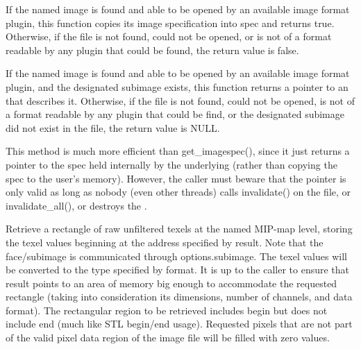 
If the named image is found and able to be opened by an available
image format plugin, this function copies its image specification into
{\cf spec} and returns {\cf true}.  Otherwise, if the file is not
found, could not be opened, or is not of a format readable by any
plugin that could be found, the return value is {\cf false}.
\apiend



If the named image is found and able to be opened by an available
image format plugin, and the designated subimage exists, this function
returns a pointer to an \ImageSpec that describes it.  Otherwise, if the
file is not found, could not be opened, is not of a format readable by
any plugin that could be find, or the designated subimage did
not exist in the file, the return value is NULL.

This method is much more efficient than {\cf get_imagespec()}, since it
just returns a pointer to the spec held internally by the underlying \ImageCache
(rather than copying the spec to the user's memory).  However, the
caller must beware that the pointer is only valid as long as nobody
(even other threads) calls {\cf invalidate()} on the file, or {\cf
  invalidate_all()}, or destroys the \TextureSystem.
\apiend


Retrieve a rectangle of raw unfiltered texels at the named MIP-map level, storing
the texel values beginning at the address specified by result.
Note that the face/subimage is communicated through {\kw options.subimage}.
The texel values will be converted to the type specified by
format.  It is up to the caller to ensure that result points to
an area of memory big enough to accommodate the requested
rectangle (taking into consideration its dimensions, number of
channels, and data format).  The rectangular region to be
retrieved includes {\cf begin} but does not include {\cf end} (much
like STL begin/end usage).
Requested pixels that are not part of the valid pixel data region of the
image file will be filled with zero values.

